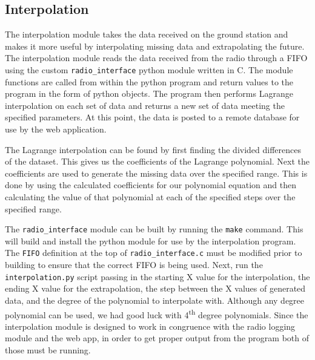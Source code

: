 \documentclass[onecolumn, draftclsnofoot,10pt, compsoc]{IEEEtran}
\begin{document}
\subsection{Interpolation}
The interpolation module takes the data received on the ground station and makes it more useful by interpolating missing data and extrapolating the future.
The interpolation module reads the data received from the radio through a FIFO using the custom \texttt{radio\_interface} python module written in C.
The module functions are called from within the python program and return values to the program in the form of python objects.
The program then performs Lagrange interpolation on each set of data and returns a new set of data meeting the specified parameters.
At this point, the data is posted to a remote database for use by the web application.

The Lagrange interpolation can be found by first finding the divided differences of the dataset.
This gives us the coefficients of the Lagrange polynomial.
Next the coefficients are used to generate the missing data over the specified range.
This is done by using the calculated coefficients for our polynomial equation and then calculating the value of that polynomial at each of the specified steps over the specified range.

The \texttt{radio\_interface} module can be built by running the \texttt{make} command.
This will build and install the python module for use by the interpolation program.
The \texttt{FIFO} definition at the top of \texttt{radio\_interface.c} must be modified prior to building to ensure that the correct FIFO is being used.
Next, run the \texttt{interpolation.py} script passing in the starting X value for the interpolation, the ending X value for the extrapolation, the step between the X values of generated data, and the degree of the polynomial to interpolate with.
Although any degree polynomial can be used, we had good luck with 4\textsuperscript{th} degree polynomials.
Since the interpolation module is designed to work in congruence with the radio logging module and the web app, in order to get proper output from the program both of those must be running.
\end{document}
